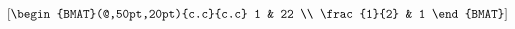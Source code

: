 \[ \left[
   \begin{BMAT}(@,50pt,20pt){c.c}{c.c}
      1 & 22 \\ \frac{1}{2} & 1
   \end{BMAT}
   \right] \]

